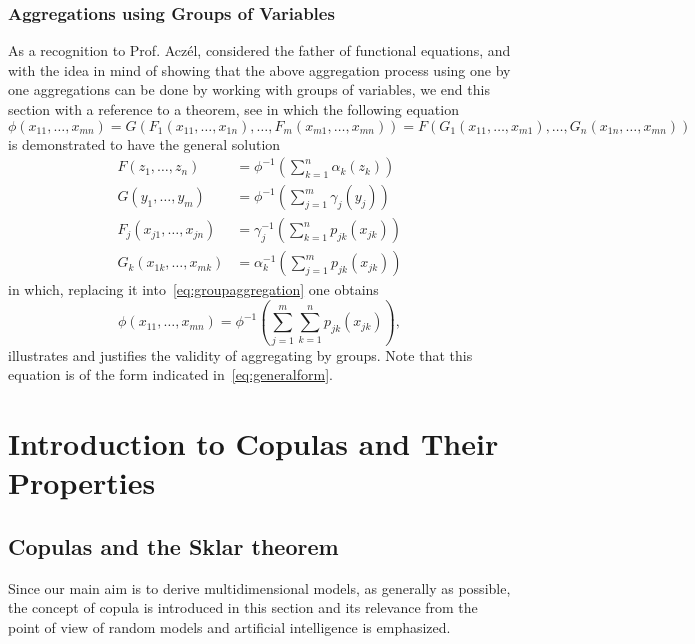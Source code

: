\documentclass[
	11pt, %
	fleqn, %
	a4paper, %
]{LegrandOrangeBook}
\begin{document}
\subsection{Aggregations using Groups of Variables}
As a recognition to Prof. Aczél, considered the father of functional equations, and with the idea in mind of showing that the above aggregation process using one by one aggregations can be done by working with groups of variables, we end this section with a reference to a theorem, see \cite{ACZEL1996104} in which the following equation
\begin{equation}
\phi(x_{11},\ldots, x_{mn}) = G(F_1(x_{11},\ldots, x_{1n}),\ldots,F_m(x_{m1},\ldots, x_{mn}))
= F(G_1(x_{11},\ldots, x_{m1}),\ldots,G_n(x_{1n},\ldots, x_{mn}))
\label{eq:groupaggregation}
\end{equation}
is demonstrated to have the general solution
\begin{align}
F(z_1,\ldots,z_n) &= \phi^{-1}\left(\sum_{k=1}^n \alpha_k(z_k)\right)\label{eq:fsolution}\\
G(y_1,\ldots,y_m) &= \phi^{-1}\left(\sum_{j=1}^m \gamma_j(y_j)\right)\label{eq:gsolution}\\
F_j(x_{j1},\ldots,x_{jn}) &= \gamma_j^{-1}\left(\sum_{k=1}^n p_{jk}(x_{jk})\right)\label{eq:fjsolution}\\
G_k(x_{1k},\ldots,x_{mk}) &= \alpha_k^{-1}\left(\sum_{j=1}^m p_{jk}(x_{jk})\right)\label{eq:gksolution}
\end{align}
in which, replacing it into~\eqref{eq:groupaggregation} one obtains
\begin{equation}
\phi(x_{11},\ldots, x_{mn}) = \phi^{-1}\left(\sum_{j=1}^m \sum_{k=1}^n p_{jk}(x_{jk})\right),
\label{eq:finalaggregation}
\end{equation}
illustrates and justifies the validity of aggregating by groups. Note that this equation is of the form indicated in~\ref{eq:generalform}.


\chapter{Introduction to Copulas and Their Properties}
\label{ch:copulas}

\section{Copulas and the Sklar theorem}

Since our main aim is to derive multidimensional models, as generally as possible, the concept of copula is introduced in this section and its relevance from the point of view of random models and artificial intelligence is emphasized.
\end{document}
